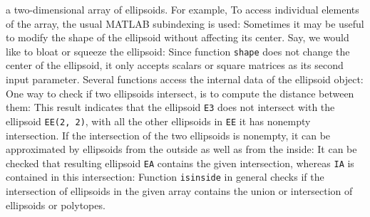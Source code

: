 \documentclass{report}
\begin{document}
a two-dimensional array of ellipsoids.
For example,
To access individual elements of the array, the usual MATLAB subindexing
is used:
Sometimes it may be useful to modify the shape of the ellipsoid without
affecting its center. Say, we would like to bloat or squeeze the ellipsoid:
Since function {\tt shape} does not change the center of the ellipsoid,
it only accepts scalars or square matrices as its second input parameter.
\newpage
Several functions  access the internal data of
the ellipsoid object:
One way to check if two ellipsoids intersect, is to compute
the distance between them:
This result indicates that the ellipsoid {\tt E3} does not intersect with
the ellipsoid {\tt EE(2, 2)}, with all the other ellipsoids in {\tt EE}
it has nonempty intersection. If the intersection of the two ellipsoids is
nonempty, it can be approximated by ellipsoids from the outside as well as
from the inside:
It can be checked that resulting ellipsoid {\tt EA} contains the given
intersection, whereas {\tt IA} is contained in this intersection:
Function {\tt isinside} in general checks if the intersection of ellipsoids
in the given array contains the union or intersection of ellipsoids or
polytopes.
\end{document}
